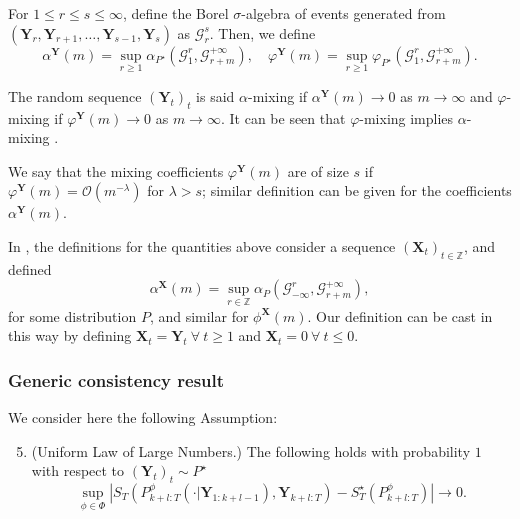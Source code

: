 \documentclass[twoside,11pt]{article}
\newcommand{\Ddsim}{\mathbf{X}}
\newcommand{\Ddobs}{\mathbf{Y}}
\newcommand{\Ddobsupkplusl}{\mathbf{Y}_{1:k+l-1}}
\newcommand{\DdobsupTfromk}{\mathbf{Y}_{k+l:T}}
\begin{document}
	
	For $ 1\le r\le s \le \infty $, define the Borel $ \sigma $-algebra of events generated from \\$( \Ddobs_r, \Ddobs_{r+1}, \ldots, \Ddobs_{s-1}, \Ddobs_s )$ as $ \mathcal{G}_r^s $. Then, we define
	\begin{equation}\label{Eq:mixing_coeff_Z}
	\alpha^\Ddobs(m) = \sup_{r\ge 1} \alpha_{P^\star}(\mathcal{G}_{1}^r, \mathcal{G}_{r+m}^{+\infty}), \quad\varphi^\Ddobs(m) = \sup_{r\ge 1} \varphi_{P^\star}(\mathcal{G}_{1}^r, \mathcal{G}_{r+m}^{+\infty}).
	\end{equation}	
	
	\begin{definition}
		The random sequence $ (\Ddobs_t)_{t} $ is said $ \alpha $-mixing if $ \alpha^\Ddobs(m )\to 0$ as $ m\to\infty $ and $ \varphi $-mixing if $ \varphi^\Ddobs(m )\to 0$ as $ m\to\infty $. It can be seen that $ \varphi $-mixing implies $ \alpha $-mixing \citep{domowitz1982}.
	\end{definition}
	
	\begin{definition}
		We say that the mixing coefficients $ \varphi^\Ddobs(m) $ are of size $ s $ \citep{domowitz1982} if $ \varphi^\Ddobs(m) = \mathcal{O}(m^{-\lambda}) $ for $\lambda>s$; similar definition can be given for the coefficients $ \alpha^\Ddobs(m) $.
	\end{definition}
	
	In \cite{bradley2005basic}, the definitions for the quantities above consider a sequence $ (\Ddsim_t)_{t\in\mathbb Z} $, and defined
	$$ \alpha^\Ddsim(m) = \sup_{r\in\mathbb Z} \alpha_{P}(\mathcal{G}_{-\infty}^r, \mathcal{G}_{r+m}^{+\infty}), $$
	for some distribution $ P $, and similar for $ \phi^\Ddsim(m) $. Our definition can be cast in this way by defining $ \Ddsim_t = \Ddobs_t \ \forall \ t\ge 1 $ and $ \Ddsim_t = 0 \ \forall\ t \le 0 $. 
	
	
	
	
	
	
	\subsubsection{Generic consistency result}\label{app:generic_consistency}
	
	We consider here the following Assumption:	
	
	
	\begin{enumerate}[label=\textbf{A\arabic*}]
		\setcounter{enumi}{4}
		\item \label{ass:A2}(Uniform Law of Large Numbers.) The following holds with probability $ 1 $ with respect to $(\Ddobs_t)_t\sim P^\star $
		\begin{equation}\label{}
		\sup_{\phi \in \Phi} \left| S_T(P^\phi_{k+l:T}(\cdot|\Ddobsupkplusl), \DdobsupTfromk) - S^\star_T(P^\phi_{k+l:T})  \right| \to 0.
		\end{equation}
	\end{enumerate}
	
\end{document}
